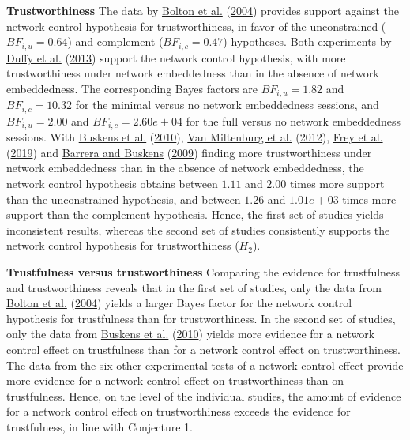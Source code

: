 \documentclass[
  11pt,
]{article}
\begin{document}
\textbf{Trustworthiness} \hspace{8pt} The data by \protect\hyperlink{ref-bolton_electronic_2004}{Bolton et al.} (\protect\hyperlink{ref-bolton_electronic_2004}{2004}) provides support against the network control hypothesis for trustworthiness, in favor of the unconstrained (\(BF_{i,u} = 0.64\)) and complement (\(BF_{i,c} = 0.47\)) hypotheses.
Both experiments by \protect\hyperlink{ref-duffy2013social}{Duffy et al.} (\protect\hyperlink{ref-duffy2013social}{2013}) support the network control hypothesis, with more trustworthiness under network embeddedness than in the absence of network embeddedness.
The corresponding Bayes factors are \(BF_{i,u} = 1.82\) and \(BF_{i,c} = 10.32\) for the minimal versus no network embeddedness sessions, and \(BF_{i,u} = 2.00\) and \(BF_{i,c} = 2.60e+04\) for the full versus no network embeddedness sessions.
With \protect\hyperlink{ref-buskens_raub_veer_triads_2010}{Buskens et al.} (\protect\hyperlink{ref-buskens_raub_veer_triads_2010}{2010}), \protect\hyperlink{ref-miltenburg_buskens_triads_2012}{Van Miltenburg et al.} (\protect\hyperlink{ref-miltenburg_buskens_triads_2012}{2012}), \protect\hyperlink{ref-frey_buskens_investments_2019}{Frey et al.} (\protect\hyperlink{ref-frey_buskens_investments_2019}{2019}) and \protect\hyperlink{ref-barrera_buskens_third_2009}{Barrera and Buskens} (\protect\hyperlink{ref-barrera_buskens_third_2009}{2009}) finding more trustworthiness under network embeddedness than in the absence of network embeddedness, the network control hypothesis obtains between \(1.11\) and \(2.00\) times more support than the unconstrained hypothesis, and between \(1.26\) and \(1.01e+03\) times more support than the complement hypothesis.
Hence, the first set of studies yields inconsistent results, whereas the second set of studies consistently supports the network control hypothesis for trustworthiness (\(H_2\)).

\textbf{Trustfulness versus trustworthiness} \hspace{8pt} Comparing the evidence for trustfulness and trustworthiness reveals that in the first set of studies, only the data from \protect\hyperlink{ref-bolton_electronic_2004}{Bolton et al.} (\protect\hyperlink{ref-bolton_electronic_2004}{2004}) yields a larger Bayes factor for the network control hypothesis for trustfulness than for trustworthiness.
In the second set of studies, only the data from \protect\hyperlink{ref-buskens_raub_veer_triads_2010}{Buskens et al.} (\protect\hyperlink{ref-buskens_raub_veer_triads_2010}{2010}) yields more evidence for a network control effect on trustfulness than for a network control effect on trustworthiness.
The data from the six other experimental tests of a network control effect provide more evidence for a network control effect on trustworthiness than on trustfulness.
Hence, on the level of the individual studies, the amount of evidence for a network control effect on trustworthiness exceeds the evidence for trustfulness, in line with Conjecture 1.
\end{document}
